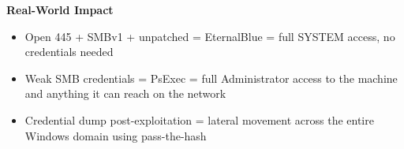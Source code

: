 \begin{notebox}
\begin{takebox}
\textbf{Real-World Impact}
\begin{itemize}
  \item Open 445 + SMBv1 + unpatched = EternalBlue = full SYSTEM access, no
        credentials needed
  \item Weak SMB credentials = PsExec = full Administrator access to the machine
        and anything it can reach on the network
  \item Credential dump post-exploitation = lateral movement across the entire
        Windows domain using pass-the-hash
\end{itemize}
\end{takebox}

\end{notebox}